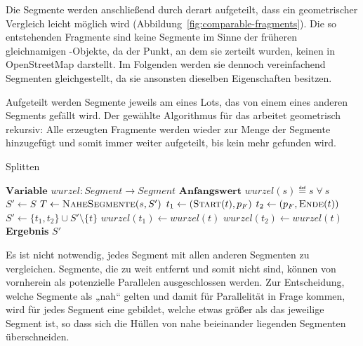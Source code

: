 \documentclass[../main/thesis.tex]{subfiles}
\begin{document}

Die Segmente werden anschließend durch  derart aufgeteilt, dass ein geometrischer Vergleich leicht möglich wird (Abbildung~\ref{fig:comparable-fragments}).
Die so entstehenden Fragmente sind keine Segmente im Sinne der früheren gleichnamigen \osm-Objekte, da der Punkt, an dem sie zerteilt wurden, keinen  in OpenStreetMap darstellt.
Im Folgenden werden sie dennoch vereinfachend Segmenten gleichgestellt, da sie ansonsten dieselben Eigenschaften besitzen.

Aufgeteilt werden Segmente jeweils am  eines Lots, das von einem  eines anderen Segments gefällt wird.
Der gewählte Algorithmus für das  arbeitet geometrisch rekursiv:
Alle erzeugten Fragmente werden wieder zur Menge der Segmente hinzugefügt und somit immer weiter aufgeteilt, bis kein  mehr gefunden wird.

\begin{algorithmhere}{Splitten}
\label{alg:Splitten}
\begin{algorithmic}
\State $\textbf{Variable } wurzel : Segment \rightarrow Segment$
\State $\textbf{Anfangswert } wurzel(s) \eqdef s\;\forall\ s$
	\State $S' \gets S$
			\State $T \gets \textproc{NaheSegmente}(s, S')$
				\State $t_1 \gets (\textproc{Start}(t), p_F)$
				\State $t_2 \gets (p_F, \textproc{Ende}(t))$
				\State $S' \gets \{t_1, t_2\} \cup S' \setminus \{t\}$
				\State $wurzel(t_1) \gets wurzel(t)$
				\State $wurzel(t_2) \gets wurzel(t)$
			\EndFor
		\EndFor
	\EndFor
	\State \textbf{Ergebnis} $S'$
\EndFunction
\end{algorithmic}
\end{algorithmhere}

Es ist nicht notwendig, jedes Segment mit allen anderen Segmenten zu vergleichen.
Segmente, die zu weit entfernt und somit nicht  sind, können von vornherein als potenzielle Parallelen ausgeschlossen werden.
Zur Entscheidung, welche Segmente als „nah“ gelten und damit für Parallelität in Frage kommen, wird für jedes Segment eine  gebildet, welche etwas größer als das jeweilige Segment ist, so dass sich die Hüllen von nahe beieinander liegenden Segmenten überschneiden.
\end{document}
